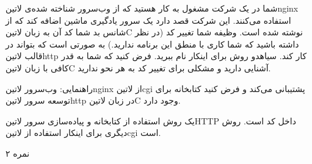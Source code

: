
شما در یک شرکت مشغول به کار هستید که از وب‌سرور شناخته شده‌ی ‌لاتین{nginx} استفاده می‌کنند. این شرکت قصد دارد یک سرور یادگیری ماشین اضافه کند که از شانس بد شما کد آن به زبان ‌لاتین{C} نوشته شده است.
وظیفه شما تغییر کد (در نظر داشته باشید که شما کاری با منطق این برنامه ندارید.) به صورتی است که بتواند در قالب ‌لاتین{http} کار کند.
‌سیاه{دو روش} برای اینکار نام ببرید. فرض کنید که شما به قدر کافی با زبان ‌لاتین{C} آشنایی دارید و مشکلی برای تغییر کد به هر نحو ندارید.

راهنمایی: وب‌سرور ‌لاتین{nginx} از ‌لاتین{cgi} پشتیبانی می‌کند و فرض کنید کتابخانه برای توسعه سرور ‌لاتین{http} در زبان ‌لاتین{C} وجود دارد.

\begin{پاسخ}

یک روش استفاده از کتابخانه و پیاده‌سازی سرور ‌لاتین{HTTP} داخل کد است.
روش دیگری برای اینکار استفاده از ‌لاتین{cgi} است.


\end{پاسخ}

۲ نمره
